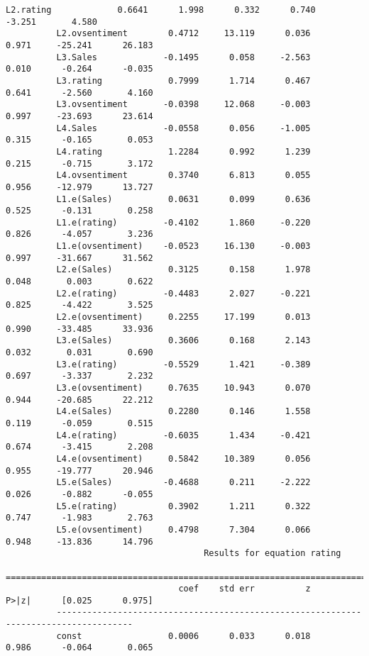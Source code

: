 \documentclass[11pt]{article}
\begin{document}
\begin{Verbatim}[commandchars=\\\{\}]
          L2.rating             0.6641      1.998      0.332      0.740      -3.251       4.580
          L2.ovsentiment        0.4712     13.119      0.036      0.971     -25.241      26.183
          L3.Sales             -0.1495      0.058     -2.563      0.010      -0.264      -0.035
          L3.rating             0.7999      1.714      0.467      0.641      -2.560       4.160
          L3.ovsentiment       -0.0398     12.068     -0.003      0.997     -23.693      23.614
          L4.Sales             -0.0558      0.056     -1.005      0.315      -0.165       0.053
          L4.rating             1.2284      0.992      1.239      0.215      -0.715       3.172
          L4.ovsentiment        0.3740      6.813      0.055      0.956     -12.979      13.727
          L1.e(Sales)           0.0631      0.099      0.636      0.525      -0.131       0.258
          L1.e(rating)         -0.4102      1.860     -0.220      0.826      -4.057       3.236
          L1.e(ovsentiment)    -0.0523     16.130     -0.003      0.997     -31.667      31.562
          L2.e(Sales)           0.3125      0.158      1.978      0.048       0.003       0.622
          L2.e(rating)         -0.4483      2.027     -0.221      0.825      -4.422       3.525
          L2.e(ovsentiment)     0.2255     17.199      0.013      0.990     -33.485      33.936
          L3.e(Sales)           0.3606      0.168      2.143      0.032       0.031       0.690
          L3.e(rating)         -0.5529      1.421     -0.389      0.697      -3.337       2.232
          L3.e(ovsentiment)     0.7635     10.943      0.070      0.944     -20.685      22.212
          L4.e(Sales)           0.2280      0.146      1.558      0.119      -0.059       0.515
          L4.e(rating)         -0.6035      1.434     -0.421      0.674      -3.415       2.208
          L4.e(ovsentiment)     0.5842     10.389      0.056      0.955     -19.777      20.946
          L5.e(Sales)          -0.4688      0.211     -2.222      0.026      -0.882      -0.055
          L5.e(rating)          0.3902      1.211      0.322      0.747      -1.983       2.763
          L5.e(ovsentiment)     0.4798      7.304      0.066      0.948     -13.836      14.796
                                       Results for equation rating                             
          =====================================================================================
                                  coef    std err          z      P>|z|      [0.025      0.975]
          -------------------------------------------------------------------------------------
          const                 0.0006      0.033      0.018      0.986      -0.064       0.065

\end{Verbatim}
\end{document}
